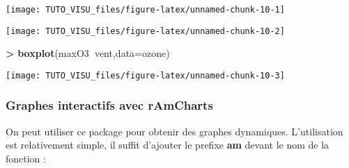 \documentclass[]{article}
\newenvironment{Shaded}{\begin{snugshade}}{\end{snugshade}}
\newcommand{\DataTypeTok}[1]{\textcolor[rgb]{0.13,0.29,0.53}{#1}}
\newcommand{\KeywordTok}[1]{\textcolor[rgb]{0.13,0.29,0.53}{\textbf{#1}}}
\newcommand{\NormalTok}[1]{#1}
\newcommand{\OperatorTok}[1]{\textcolor[rgb]{0.81,0.36,0.00}{\textbf{#1}}}
\newcommand{\StringTok}[1]{\textcolor[rgb]{0.31,0.60,0.02}{#1}}
\theoremstyle{definition}
\theoremstyle{definition}
\theoremstyle{definition}
\theoremstyle{remark}
\begin{document}
\begin{Shaded}
\end{Shaded}

\begin{center}\texttt{[image: TUTO\_VISU\_files/figure-latex/unnamed-chunk-10-1]} \end{center}

\begin{Shaded}
\end{Shaded}

\begin{center}\texttt{[image: TUTO\_VISU\_files/figure-latex/unnamed-chunk-10-2]} \end{center}

\begin{Shaded}
\begin{Highlighting}[]
\OperatorTok{>}\StringTok{ }\KeywordTok{boxplot}\NormalTok{(maxO3}\OperatorTok{~}\NormalTok{vent,}\DataTypeTok{data=}\NormalTok{ozone)}
\end{Highlighting}
\end{Shaded}

\begin{center}\texttt{[image: TUTO\_VISU\_files/figure-latex/unnamed-chunk-10-3]} \end{center}

\hypertarget{graphes-interactifs-avec-ramcharts}{%
\subsubsection{Graphes interactifs avec rAmCharts}\label{graphes-interactifs-avec-ramcharts}}

On peut utiliser ce package pour obtenir des graphes dynamiques. L'utilisation est relativement simple, il suffit d'ajouter le prefixe \textbf{am} devant le nom de la fonction :

\begin{Shaded}
\end{Shaded}
\end{document}
